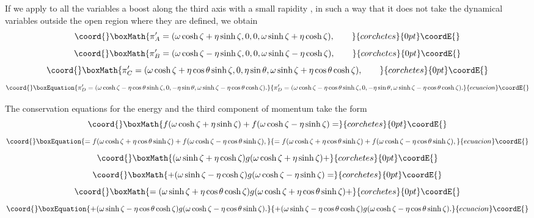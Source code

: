 \documentclass[a4paper,12pt]{article}
\begin{document}
If we apply to all the variables a boost along the third axis with a small rapidity \myHighlight{$\zeta$}\coordHE{}, in such a way that it does not take the dynamical variables outside the open region where they are defined, we obtain
\begin{displaymath}\coord{}\boxMath{
\pi'_A = (\omega \cosh\zeta + \eta \sinh\zeta, 0, 0, \omega \sinh\zeta +\eta \cosh\zeta), \qquad
}{corchetes}{0pt}\coordE{}\end{displaymath}
\begin{displaymath}\coord{}\boxMath{
\pi'_B = (\omega \cosh\zeta - \eta \sinh\zeta, 0, 0, \omega \sinh\zeta - \eta \cosh\zeta), \qquad
}{corchetes}{0pt}\coordE{}\end{displaymath}
\begin{displaymath}\coord{}\boxMath{
\pi'_C = (\omega \cosh\zeta + \eta \cos\theta \sinh\zeta, 0, \eta \sin\theta, 
\omega \sinh\zeta +\eta \cos\theta \cosh\zeta), \qquad
}{corchetes}{0pt}\coordE{}\end{displaymath}
\begin{equation}\coord{}\boxEquation{
\pi'_D = (\omega \cosh\zeta - \eta \cos\theta \sinh\zeta, 0, -\eta \sin\theta, 
\omega \sinh\zeta - \eta \cos\theta \cosh\zeta).
}{
\pi'_D = (\omega \cosh\zeta - \eta \cos\theta \sinh\zeta, 0, -\eta \sin\theta, 
\omega \sinh\zeta - \eta \cos\theta \cosh\zeta).
}{ecuacion}\coordE{}\end{equation}

The conservation equations for the energy and the third component of momentum take the form
\begin{displaymath}\coord{}\boxMath{
f(\omega \cosh\zeta + \eta \sinh\zeta) + f(\omega \cosh\zeta - \eta \sinh\zeta) =
}{corchetes}{0pt}\coordE{}\end{displaymath}
\begin{equation}\coord{}\boxEquation{ \label{En}
= f(\omega \cosh\zeta + \eta \cos\theta \sinh\zeta) + f(\omega \cosh\zeta - \eta \cos\theta \sinh\zeta),
}{ = f(\omega \cosh\zeta + \eta \cos\theta \sinh\zeta) + f(\omega \cosh\zeta - \eta \cos\theta \sinh\zeta),
}{ecuacion}\coordE{}\end{equation}
\begin{displaymath}\coord{}\boxMath{
(\omega \sinh\zeta +\eta \cosh\zeta) g(\omega \cosh\zeta + \eta \sinh\zeta) +
}{corchetes}{0pt}\coordE{}\end{displaymath}
\begin{displaymath}\coord{}\boxMath{
+ (\omega \sinh\zeta - \eta \cosh\zeta) g(\omega \cosh\zeta - \eta \sinh\zeta) =
}{corchetes}{0pt}\coordE{}\end{displaymath}
\begin{displaymath}\coord{}\boxMath{
= (\omega \sinh\zeta +\eta \cos\theta \cosh\zeta) g(\omega \cosh\zeta + \eta \cos\theta \sinh\zeta) +
}{corchetes}{0pt}\coordE{}\end{displaymath}
\begin{equation}\coord{}\boxEquation{ \label{Momen}
+ (\omega \sinh\zeta - \eta \cos\theta \cosh\zeta) g(\omega \cosh\zeta - \eta \cos\theta \sinh\zeta).
}{ + (\omega \sinh\zeta - \eta \cos\theta \cosh\zeta) g(\omega \cosh\zeta - \eta \cos\theta \sinh\zeta).
}{ecuacion}\coordE{}\end{equation}
\end{document}
